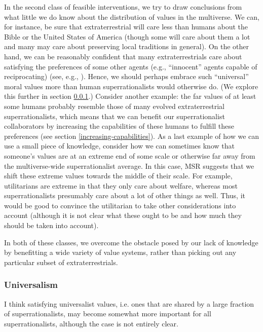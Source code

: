 In the second class of feasible interventions, we try to draw
conclusions from what little we do know about the distribution of values
in the multiverse. We can, for instance, be sure that extraterrestrial
will care less than humans about the Bible or the United States of
America (though some will care about them a lot and many may care about
preserving local traditions in general). On the other hand, we can be
reasonably confident that many extraterrestrials care about satisfying
the preferences of some other agents (e.g., ``innocent'' agents capable
of reciprocating) (see, e.g.,
\parencite{Axelrod2006-ci,Trivers1971-rb,Fehr1999-pd,Dawkins1976-cd,Taylor1987-wn,Buss2015-kp}).
Hence, we should perhaps embrace such ``universal'' moral values more
than human superrationalists would otherwise do. (We explore this
further in section
\ref{universalism}.) Consider
another example: the far values of at least some humans probably
resemble those of many evolved extraterrestrial superrationalists, which
means that we can benefit our superrationalist collaborators by
increasing the capabilities of these humans to fulfill these preferences
(see section
\ref{increasing-capabilities}). As a last example of how we can use a small piece of
knowledge, consider how we can sometimes know that someone's values are
at an extreme end of some scale or otherwise far away from the
multiverse-wide superrationalist average. In this case, MSR suggests
that we shift these extreme values towards the middle of their scale.
For example, utilitarians are extreme in that they only care about
welfare, whereas most superrationalists presumably care about a lot of
other things as well. Thus, it would be good to convince the utilitarian
to take other considerations into account (although it is not clear what
these ought to be and how much they should be taken into account).

In both of these classes, we overcome the obstacle posed by our lack of
knowledge by benefitting a wide variety of value systems, rather than
picking out any particular subset of extraterrestrials.

\hypertarget{universalism}{\subsubsection{Universalism}\label{universalism}}

I think satisfying universalist values, i.e. ones that are shared by a
large fraction of superrationalists, may become somewhat more important
for all superrationalists, although the case is not entirely clear.

